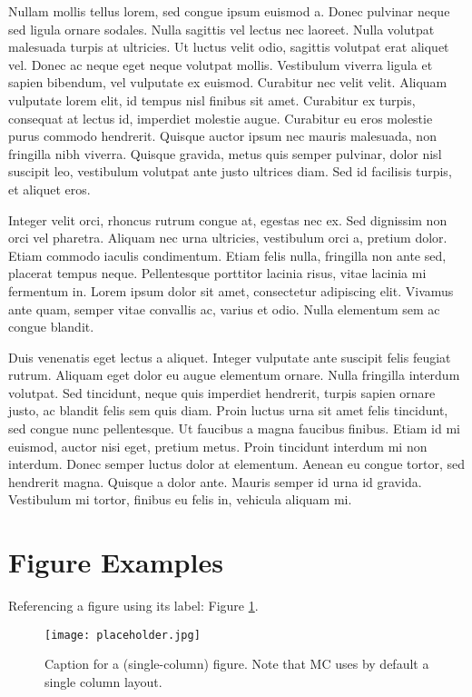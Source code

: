 \documentclass{mathcryptology} %
\begin{document}
Nullam mollis tellus lorem, sed congue ipsum euismod a. Donec pulvinar neque sed ligula ornare sodales. Nulla sagittis vel lectus nec laoreet. Nulla volutpat malesuada turpis at ultricies. Ut luctus velit odio, sagittis volutpat erat aliquet vel. Donec ac neque eget neque volutpat mollis. Vestibulum viverra ligula et sapien bibendum, vel vulputate ex euismod. Curabitur nec velit velit. Aliquam vulputate lorem elit, id tempus nisl finibus sit amet. Curabitur ex turpis, consequat at lectus id, imperdiet molestie augue. Curabitur eu eros molestie purus commodo hendrerit. Quisque auctor ipsum nec mauris malesuada, non fringilla nibh viverra. Quisque gravida, metus quis semper pulvinar, dolor nisl suscipit leo, vestibulum volutpat ante justo ultrices diam. Sed id facilisis turpis, et aliquet eros.

Integer velit orci, rhoncus rutrum congue at, egestas nec ex. Sed dignissim non orci vel pharetra. Aliquam nec urna ultricies, vestibulum orci a, pretium dolor. Etiam commodo iaculis condimentum. Etiam felis nulla, fringilla non ante sed, placerat tempus neque. Pellentesque porttitor lacinia risus, vitae lacinia mi fermentum in. Lorem ipsum dolor sit amet, consectetur adipiscing elit. Vivamus ante quam, semper vitae convallis ac, varius et odio. Nulla elementum sem ac congue blandit.

Duis venenatis eget lectus a aliquet. Integer vulputate ante suscipit felis feugiat rutrum. Aliquam eget dolor eu augue elementum ornare. Nulla fringilla interdum volutpat. Sed tincidunt, neque quis imperdiet hendrerit, turpis sapien ornare justo, ac blandit felis sem quis diam. Proin luctus urna sit amet felis tincidunt, sed congue nunc pellentesque. Ut faucibus a magna faucibus finibus. Etiam id mi euismod, auctor nisi eget, pretium metus. Proin tincidunt interdum mi non interdum. Donec semper luctus dolor at elementum. Aenean eu congue tortor, sed hendrerit magna. Quisque a dolor ante. Mauris semper id urna id gravida. Vestibulum mi tortor, finibus eu felis in, vehicula aliquam mi.


\section{Figure Examples}

Referencing a figure using its label: Figure \ref{fig:onecolumn}.

\begin{figure}[h] %
	\centering %
	\texttt{[image: placeholder.jpg]}
	\caption{Caption for a (single-column) figure. Note that MC uses by default a single column layout.}
	\label{fig:onecolumn} %
\end{figure}
\end{document}
